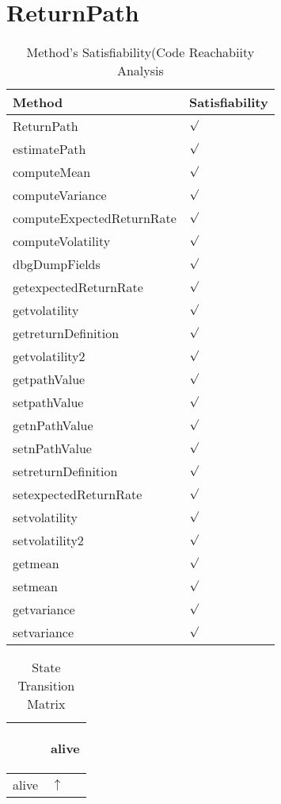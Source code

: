 \documentclass[10pt]{article}
\begin{document}
\section{{\color{Fuchsia}ReturnPath}}
\label{ReturnPath}
\begin{longtable}{|l|l|}
\caption{Method's Satisfiability(Code Reachabiity Analysis}\\
\hline
Method & Satisfiability\\
\hline
ReturnPath&{\color{blue}$\surd$}\\
\hline
estimatePath&{\color{blue}$\surd$}\\
\hline
computeMean&{\color{blue}$\surd$}\\
\hline
computeVariance&{\color{blue}$\surd$}\\
\hline
computeExpectedReturnRate&{\color{blue}$\surd$}\\
\hline
computeVolatility&{\color{blue}$\surd$}\\
\hline
dbgDumpFields&{\color{blue}$\surd$}\\
\hline
getexpectedReturnRate&{\color{blue}$\surd$}\\
\hline
getvolatility&{\color{blue}$\surd$}\\
\hline
getreturnDefinition&{\color{blue}$\surd$}\\
\hline
getvolatility2&{\color{blue}$\surd$}\\
\hline
getpathValue&{\color{blue}$\surd$}\\
\hline
setpathValue&{\color{blue}$\surd$}\\
\hline
getnPathValue&{\color{blue}$\surd$}\\
\hline
setnPathValue&{\color{blue}$\surd$}\\
\hline
setreturnDefinition&{\color{blue}$\surd$}\\
\hline
setexpectedReturnRate&{\color{blue}$\surd$}\\
\hline
setvolatility&{\color{blue}$\surd$}\\
\hline
setvolatility2&{\color{blue}$\surd$}\\
\hline
getmean&{\color{blue}$\surd$}\\
\hline
setmean&{\color{blue}$\surd$}\\
\hline
getvariance&{\color{blue}$\surd$}\\
\hline
setvariance&{\color{blue}$\surd$}\\
\hline
\end{longtable}
\begin{longtable}{|l|l|}
\caption{State Transition Matrix}\\
\hline
&\begin{sideways}alive\end{sideways}\\
\hline
alive&{\color{blue}$\uparrow$}\\
\hline
\end{longtable}
\end{document}
